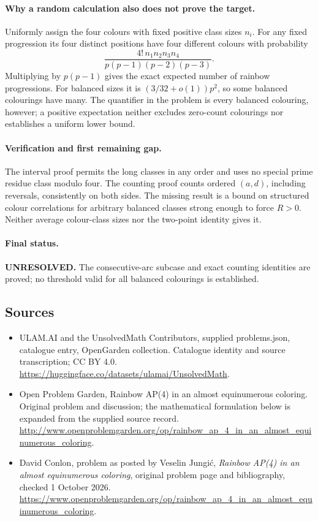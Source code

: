 \documentclass[11pt,a4paper]{article}
\begin{document}
\paragraph{Why a random calculation also does not prove the target.}
Uniformly assign the four colours with fixed positive class sizes $n_i$.
For any fixed progression its four distinct positions have four
different colours with probability
\[
 \frac{4!\,n_1n_2n_3n_4}{p(p-1)(p-2)(p-3)}.
\]
Multiplying by $p(p-1)$ gives the exact expected number of rainbow
progressions. For balanced sizes it is $(3/32+o(1))p^2$, so some
balanced colourings have many. The quantifier in the problem is every
balanced colouring, however; a positive expectation neither excludes
zero-count colourings nor establishes a uniform lower bound.

\paragraph{Verification and first remaining gap.}
The interval proof permits the long classes in any order and uses no
special prime residue class modulo four. The counting proof counts
ordered $(a,d)$, including reversals, consistently on both sides.
The missing result is a bound on structured colour correlations for
arbitrary balanced classes strong enough to force $R>0$. Neither
average colour-class sizes nor the two-point identity gives it.

\paragraph{Final status.}
\textbf{UNRESOLVED.} The consecutive-arc subcase and exact counting
identities are proved; no threshold valid for all balanced colourings
is established.

\subsection{Sources}
\begin{itemize}
\item[S1] ULAM.AI and the UnsolvedMath Contributors, supplied problems.json, catalogue entry, OpenGarden collection. Catalogue identity and source transcription; CC BY 4.0.
\url{https://huggingface.co/datasets/ulamai/UnsolvedMath}.
\item[S2] Open Problem Garden, Rainbow AP(4) in an almost equinumerous coloring. Original problem and discussion; the mathematical formulation below is expanded from the supplied source record.
\url{http://www.openproblemgarden.org/op/rainbow_ap_4_in_an_almost_equinumerous_coloring}.

\item[R1] David Conlon, problem as posted by Veselin Jungi\'c,
\emph{Rainbow AP(4) in an almost equinumerous coloring}, original
problem page and bibliography, checked 1 October 2026.
\url{https://www.openproblemgarden.org/op/rainbow_ap_4_in_an_almost_equinumerous_coloring}.

\end{itemize}
\end{document}
